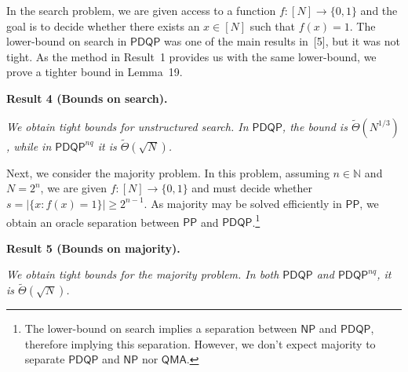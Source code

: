 \documentclass[10pt,a4paper]{article}
\begin{document}
In the search problem, we are given access to a function $f:[N]\rightarrow\{0,1\}$ and the goal is to decide whether there exists an $x\in[N]$ such that $f(x)=1$. The lower-bound on search in $\mathsf{PDQP}$ was one of the main results in [5], but it was not tight. As the method in Result 1 provides us with the same lower-bound, we prove a tighter bound in Lemma 19.\par





\par\medskip\noindent\textbf{
\textbf{Result 4}\textbf{ }(\textbf{Bounds on search})\textbf{.}
}\par



\emph{We obtain tight bounds for unstructured search. In $\mathsf{PDQP}$, the bound is $\tilde{\Theta}(N^{1/3})$, while in $\mathsf{PDQP}^{nq}$ it is $\tilde{\Theta}(\sqrt{N})$.}\par






Next, we consider the majority problem. In this problem, assuming $n\in\mathbb{N}$ and $N=2^{n}$, we are given $f:[N]\rightarrow\{0,1\}$ and must decide whether $s=|\{x:f(x)=1\}|\geq 2^{n-1}$. As majority may be solved efficiently in $\mathsf{PP}$, we obtain an oracle separation between $\mathsf{PP}$ and $\mathsf{PDQP}$.\footnote{The lower-bound on search implies a separation between $\mathsf{NP}$ and $\mathsf{PDQP}$, therefore implying this separation. However, we don’t expect majority to separate $\mathsf{PDQP}$ and $\mathsf{NP}$ nor $\mathsf{QMA}$.}\par





\par\medskip\noindent\textbf{
\textbf{Result 5}\textbf{ }(\textbf{Bounds on majority})\textbf{.}
}\par



\emph{We obtain tight bounds for the majority problem. In both $\mathsf{PDQP}$ and $\mathsf{PDQP}^{nq}$, it is $\tilde{\Theta}(\sqrt{N})$.}\par



\end{document}
